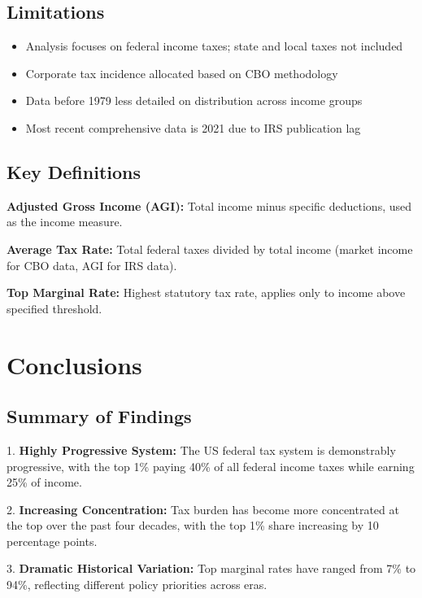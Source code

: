 \documentclass[11pt,letterpaper]{article}
\begin{document}
\subsection{Limitations}

\begin{itemize}
    \item Analysis focuses on federal income taxes; state and local taxes not included
    \item Corporate tax incidence allocated based on CBO methodology
    \item Data before 1979 less detailed on distribution across income groups
    \item Most recent comprehensive data is 2021 due to IRS publication lag
\end{itemize}

\subsection{Key Definitions}

\textbf{Adjusted Gross Income (AGI):} Total income minus specific deductions, used as the income measure.

\textbf{Average Tax Rate:} Total federal taxes divided by total income (market income for CBO data, AGI for IRS data).

\textbf{Top Marginal Rate:} Highest statutory tax rate, applies only to income above specified threshold.

\newpage

\section{Conclusions}

\subsection{Summary of Findings}

1. \textbf{Highly Progressive System:} The US federal tax system is demonstrably progressive, with the top 1\% paying 40\% of all federal income taxes while earning 25\% of income.

2. \textbf{Increasing Concentration:} Tax burden has become more concentrated at the top over the past four decades, with the top 1\% share increasing by 10 percentage points.

3. \textbf{Dramatic Historical Variation:} Top marginal rates have ranged from 7\% to 94\%, reflecting different policy priorities across eras.
\end{document}
